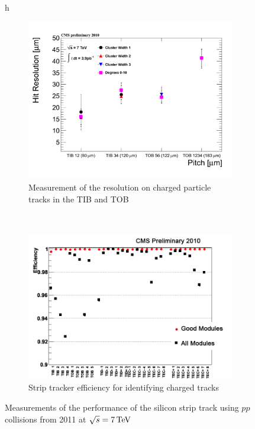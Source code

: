 \begin{figure}{h}
    \centering
    \begin{subfigure}[h]{0.450\textwidth}
        \includegraphics[width=\textwidth]{Figures/CMS_Diagrams/Tracker__Strip_HitRes.pdf}
        \caption{Measurement of the resolution on charged particle
          tracks in the TIB and TOB}\label{fig:tracker_strip_hitRes}
      \end{subfigure}
      ~ %
    \begin{subfigure}[h]{0.450\textwidth}
        \includegraphics[width=\textwidth]{Figures/CMS_Diagrams/Tracker__Strip_efficiency_end2010.png}
        \caption{Strip tracker efficiency for identifying charged tracks}\label{fig:tracker_strip_efficiency}
      \end{subfigure}
      \caption{Measurements of the performance of the silicon strip
        track using $pp$ collisions from 2011 at $\sqrt{s}=7 \,\text{Te\hspace{-.08em}V}$}\label{fig:tracker_strip_performance}
\end{figure}

